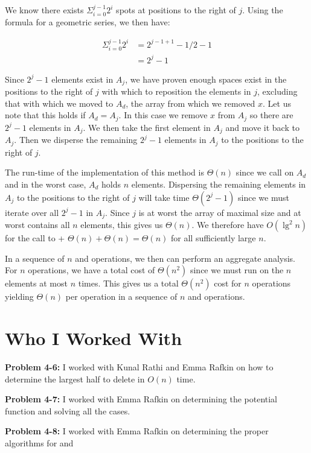 \documentclass[11pt]{article}
\begin{document}
We know there exists $\Sigma_{i=0}^{j-1}{2^i}$ spots at positions to the right of $j$. Using the formula for a geometric series, we then have:

\hspace*{3mm}
\begin{equation}
\begin{split}
\Sigma_{i=0}^{j-1}{2^i} &= 2^{j-1+1} - 1 / 2 - 1\\
                        &= 2^j - 1
\end{split}
\end{equation}

Since $2^j - 1$ elements exist in $A_j$, we have proven enough spaces exist in the positions to the right of $j$ with which to reposition the elements in $j$, excluding that with which we moved to $A_d$, the array from which we removed $x$. Let us note that this holds if $A_d = A_j$. In this case we remove $x$ from $A_j$ so there are $2^j - 1$ elements in $A_j$. We then take the first element in $A_j$ and move it back to $A_j$. Then we disperse the remaining $2^j - 1$ elements in $A_j$ to the positions to the right of $j$.

The run-time of the implementation of this method is $\Theta(n)$ since we call  on $A_d$ and in the worst case, $A_d$ holds $n$ elements. Dispersing the remaining elements in $A_j$ to the positions to the right of $j$ will take time $\Theta(2^j - 1)$ since we must iterate over all $2^j - 1$ in $A_j$. Since $j$ is at worst the array of maximal size and at worst contains all $n$ elements, this gives us $\Theta(n)$. We therefore have $O(\lg^2{n})$ for the call to  + $\Theta(n) + \Theta(n) = \Theta(n)$ for all sufficiently large $n$.

In a sequence of $n$  and  operations, we then can perform an aggregate analysis. For $n$ operations, we have a total cost of $\Theta(n^2)$ since we must run  on the $n$ elements at most $n$ times. This gives us a total $\Theta(n^2)$ cost for $n$ operations yielding $\Theta(n)$ per  operation in a sequence of $n$  and  operations.

\newpage

\section{Who I Worked With}

\textbf{Problem 4-6:} I worked with Kunal Rathi and Emma Rafkin on how to determine the largest half to delete in $O(n)$ time.

\textbf{Problem 4-7:} I worked with Emma Rafkin on determining the potential function and solving all the cases.

\textbf{Problem 4-8:} I worked with Emma Rafkin on determining the proper algorithms for  and 
\end{document}
